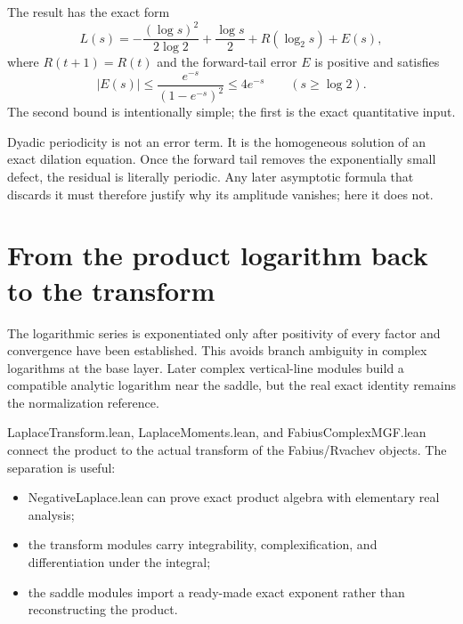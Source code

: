\documentclass[11pt,a4paper,openany]{book}
\def\module#1{#1.lean}
\newcommand{\module}[1]{\nolinkurl{#1.lean}}
\begin{document}
The result has the exact form
\[
 L(s)=
 -\frac{(\log s)^2}{2\log2}
 +\frac{\log s}{2}
 +R(\log_2s)+E(s),
\]
where $R(t+1)=R(t)$ and the forward-tail error $E$ is positive and satisfies
\[
 |E(s)|\le
 \frac{e^{-s}}{(1-e^{-s})^2}
 \le4e^{-s}\qquad(s\ge\log2).
\]
The second bound is intentionally simple; the first is the exact quantitative
input.

\begin{proofidea}
Dyadic periodicity is not an error term.  It is the homogeneous solution of an
exact dilation equation.  Once the forward tail removes the exponentially
small defect, the residual is literally periodic.  Any later asymptotic formula
that discards it must therefore justify why its amplitude vanishes; here it
does not.
\end{proofidea}

\section{From the product logarithm back to the transform}
The logarithmic series is exponentiated only after positivity of every factor
and convergence have been established.  This avoids branch ambiguity in
complex logarithms at the base layer.  Later complex vertical-line modules
build a compatible analytic logarithm near the saddle, but the real exact
identity remains the normalization reference.

\module{LaplaceTransform}, \module{LaplaceMoments}, and
\module{FabiusComplexMGF} connect the product to the actual transform of the
Fabius/Rvachev objects.  The separation is useful:
\begin{itemize}
  \item \module{NegativeLaplace} can prove exact product algebra with elementary
        real analysis;
  \item the transform modules carry integrability, complexification, and
        differentiation under the integral;
  \item the saddle modules import a ready-made exact exponent rather than
        reconstructing the product.
\end{itemize}
\end{document}
